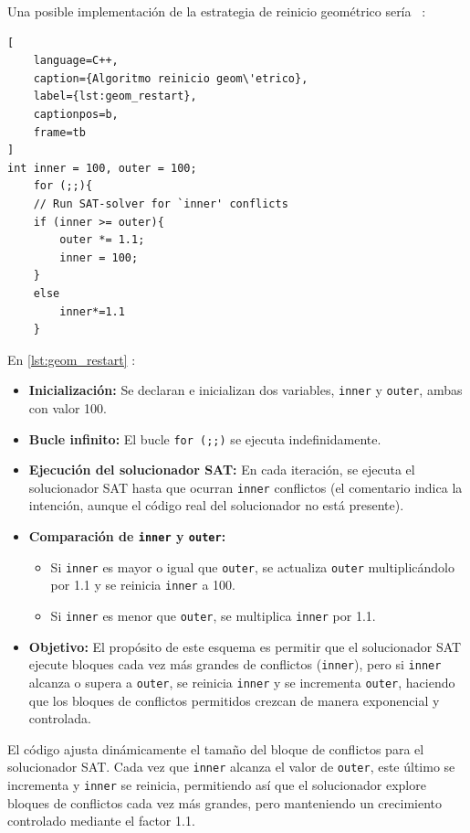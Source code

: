 Una posible implementaci\'on de la estrategia de reinicio geom\'etrico ser\'ia \ :

\begin{lstlisting}[
    language=C++,
    caption={Algoritmo reinicio geom\'etrico},
    label={lst:geom_restart},
    captionpos=b,
    frame=tb
]
int inner = 100, outer = 100;
	for (;;){
	// Run SAT-solver for `inner' conflicts
	if (inner >= outer){
		outer *= 1.1;
		inner = 100;
	}
	else
		inner*=1.1
	}

\end{lstlisting}

En \ref{lst:geom_restart} \cite{oliveras2009dpll_cdcl}:
\begin{itemize}
    \item \textbf{Inicialización:} Se declaran e inicializan dos variables, \texttt{inner} y \texttt{outer}, ambas con valor 100.
    \item \textbf{Bucle infinito:} El bucle \texttt{for (;;)} se ejecuta indefinidamente.
    \item \textbf{Ejecución del solucionador SAT:} En cada iteración, se ejecuta el solucionador SAT hasta que ocurran \texttt{inner} conflictos (el comentario indica la intención, aunque el código real del solucionador no está presente).
    \item \textbf{Comparación de \texttt{inner} y \texttt{outer}:}
    \begin{itemize}
        \item Si \texttt{inner} es mayor o igual que \texttt{outer}, se actualiza \texttt{outer} multiplicándolo por 1.1 y se reinicia \texttt{inner} a 100.
        \item Si \texttt{inner} es menor que \texttt{outer}, se multiplica \texttt{inner} por 1.1.
    \end{itemize}
    \item \textbf{Objetivo:} El propósito de este esquema es permitir que el solucionador SAT ejecute bloques cada vez más grandes de conflictos (\texttt{inner}), pero si \texttt{inner} alcanza o supera a \texttt{outer}, se reinicia \texttt{inner} y se incrementa \texttt{outer}, haciendo que los bloques de conflictos permitidos crezcan de manera exponencial y controlada.
\end{itemize}

El código ajusta dinámicamente el tamaño del bloque de conflictos para el solucionador SAT. Cada vez que \texttt{inner} alcanza el valor de \texttt{outer}, este último se incrementa y \texttt{inner} se reinicia, permitiendo así que el solucionador explore bloques de conflictos cada vez más grandes, pero manteniendo un crecimiento controlado mediante el factor 1.1.

